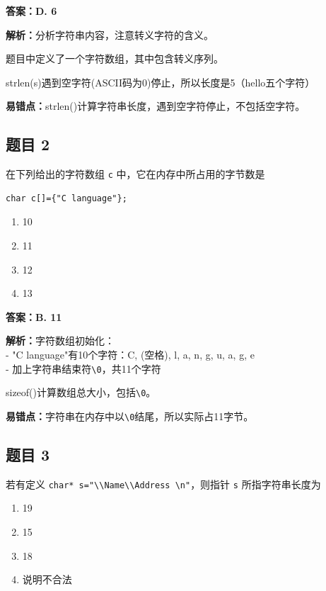 \documentclass[12pt,a4paper]{ctexart}
\begin{document}
\begin{answerbox}
	\textbf{答案：D. 6}

	\textbf{解析：}分析字符串内容，注意转义字符的含义。

	题目中定义了一个字符数组，其中包含转义序列。

	strlen(s)遇到空字符(ASCII码为0)停止，所以长度是5（hello五个字符）

	\textbf{易错点：}strlen()计算字符串长度，遇到空字符停止，不包括空字符。
\end{answerbox}

\subsection*{题目 2}
在下列给出的字符数组 \texttt{c} 中，它在内存中所占用的字节数是
\begin{lstlisting}
char c[]={"C language"};
\end{lstlisting}

\begin{enumerate}[label=\Alph*.]
	\item 10
	\item 11
	\item 12
	\item 13
\end{enumerate}

\begin{answerbox}
	\textbf{答案：B. 11}

	\textbf{解析：}字符数组初始化：\\
	- "C language"有10个字符：C, (空格), l, a, n, g, u, a, g, e\\
	- 加上字符串结束符\texttt{\textbackslash 0}，共11个字符

	sizeof()计算数组总大小，包括\texttt{\textbackslash 0}。

	\textbf{易错点：}字符串在内存中以\texttt{\textbackslash 0}结尾，所以实际占11字节。
\end{answerbox}
\subsection*{题目 3}
若有定义 \texttt{char* s="\textbackslash\textbackslash Name\textbackslash\textbackslash Address \textbackslash n"}，则指针 \texttt{s} 所指字符串长度为
\begin{enumerate}[label=\Alph*.]
    \item 19
    \item 15
    \item 18
    \item 说明不合法
\end{enumerate}
\end{document}
